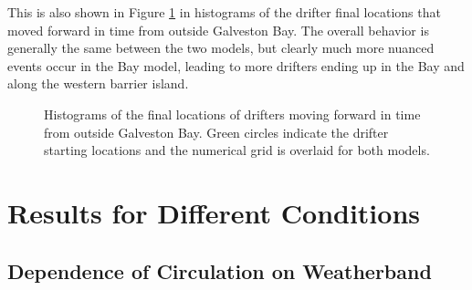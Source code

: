 \documentclass[11pt]{article}
\begin{document}
This is also shown in Figure \ref{fig:bayhexbin} in histograms of the drifter final locations that moved forward in time from outside Galveston Bay. The overall behavior is generally the same between the two models, but clearly much more nuanced events occur in the Bay model, leading to more drifters ending up in the Bay and along the western barrier island.

\begin{figure}
    \centering
    \caption{Histograms of the final locations of drifters moving forward in time from outside Galveston Bay. Green circles indicate the drifter starting locations and the numerical grid is overlaid for both models.}
    \label{fig:bayhexbin}
\end{figure}

\section{Results for Different Conditions}

\subsection{Dependence of Circulation on Weatherband}
\end{document}
